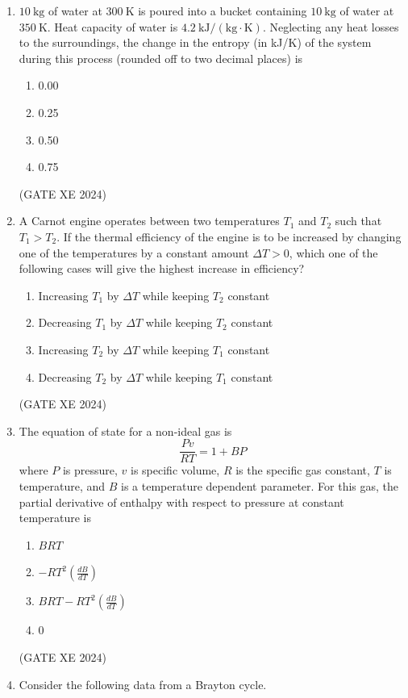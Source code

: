 \documentclass[12pt]{article}
\begin{document}
\begin{enumerate}
\item $10~\mathrm{kg}$ of water at $300~\mathrm{K}$ is poured into a bucket containing $10~\mathrm{kg}$ of water at $350~\mathrm{K}$. Heat capacity of water is $4.2~\mathrm{kJ/(kg\cdot K)}$. Neglecting any heat losses to the surroundings, the change in the entropy (in kJ/K) of the system during this process (rounded off to two decimal places) is
\begin{enumerate}
    \item 0.00
    \item 0.25
    \item 0.50
    \item 0.75
\end{enumerate}
(GATE XE 2024)

\item A Carnot engine operates between two temperatures $T_1$ and $T_2$ such that $T_1>T_2$. If the thermal efficiency of the engine is to be increased by changing one of the temperatures by a constant amount $\Delta T>0$, which one of the following cases will give the highest increase in efficiency?
\begin{enumerate}
    \item Increasing $T_1$ by $\Delta T$ while keeping $T_2$ constant
    \item Decreasing $T_1$ by $\Delta T$ while keeping $T_2$ constant
    \item Increasing $T_2$ by $\Delta T$ while keeping $T_1$ constant
    \item Decreasing $T_2$ by $\Delta T$ while keeping $T_1$ constant
\end{enumerate}
(GATE XE 2024)

\item The equation of state for a non-ideal gas is  
$$
\frac{Pv}{RT} = 1 + BP
$$
where $P$ is pressure, $v$ is specific volume, $R$ is the specific gas constant, $T$ is temperature, and $B$ is a temperature dependent parameter. For this gas, the partial derivative of enthalpy with respect to pressure at constant temperature is  
\begin{enumerate}
    \item $BRT$
    \item $-RT^2 \left(\frac{dB}{dT}\right)$
    \item $BRT - RT^2 \left(\frac{dB}{dT}\right)$
    \item $0$
\end{enumerate}
(GATE XE 2024)

\item Consider the following data from a Brayton cycle.  


\end{enumerate}
\end{document}
